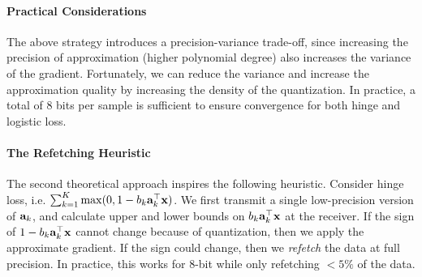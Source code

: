 \documentclass{article}
\def\a{{\bf a}}
\def\x{{\bf x}}
\begin{document}
\paragraph{Practical Considerations} The above strategy introduces a precision-variance trade-off, since increasing the precision of approximation (higher polynomial degree) also increases the variance of the gradient. 
Fortunately, we can reduce the variance and increase the approximation quality by increasing the density of the quantization. 
In practice, a total of $8$ bits per sample is sufficient to ensure convergence for both hinge and logistic loss. 

\paragraph*{The Refetching Heuristic}
The second theoretical approach inspires the following heuristic. 
Consider hinge loss, i.e.  $\sum_{k=1}^K \max(0, 1 - b_k \a_k^\top \x)$. 
We first transmit a single low-precision version of $\a_k$, and   
calculate upper and lower bounds on $b_k \a_k^\top \x$ at the receiver.
If the sign of $1-b_k \a_k^\top \x$ cannot change because of quantization, then we apply the approximate gradient. 
If the sign could change, then we {\em refetch} the data at full precision.
In practice, this works for 
8-bit while only refetching $<5\%$ of the data.
\end{document}
